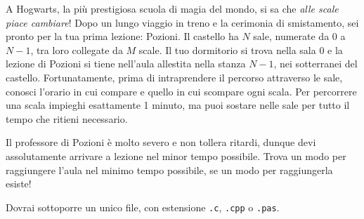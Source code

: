 \usepackage{xcolor}
\usepackage{afterpage}
\usepackage{pifont,mdframed}
\usepackage[bottom]{footmisc}



\newcommand{\inputfile}{\texttt{stdin}}
\newcommand{\outputfile}{\texttt{stdout}}

\newenvironment{warning}
  {\par\begin{mdframed}[linewidth=2pt,linecolor=gray]%
    \begin{list}{}{\leftmargin=1cm
                   \labelwidth=\leftmargin}\item[\Large\ding{43}]}
  {\end{list}\end{mdframed}\par}



	A Hogwarts, la più prestigiosa scuola di magia del mondo, si sa che \emph{alle scale piace cambiare}! Dopo un lungo viaggio in treno e la cerimonia di smistamento, sei pronto per la tua prima lezione: Pozioni. Il castello ha $N$ sale, numerate da $0$ a $N-1$, tra loro collegate da $M$ scale. Il tuo dormitorio si trova nella sala $0$ e la lezione di Pozioni si tiene nell'aula allestita nella stanza $N-1$, nei sotterranei del castello. Fortunatamente, prima di intraprendere il percorso attraverso le sale, conosci l'orario in cui compare e quello in cui scompare ogni scala. Per percorrere una scala impieghi esattamente 1 minuto, ma puoi sostare nelle sale per tutto il tempo che ritieni necessario. 
	
	Il professore di Pozioni è molto severo e non tollera ritardi, dunque devi assolutamente arrivare a lezione nel minor tempo possibile. Trova un modo per raggiungere l'aula nel minimo tempo possibile, se un modo per raggiungerla esiste!


\Implementation

Dovrai sottoporre un unico file, con estensione \texttt{.c}, \texttt{.cpp} o \texttt{.pas}.

